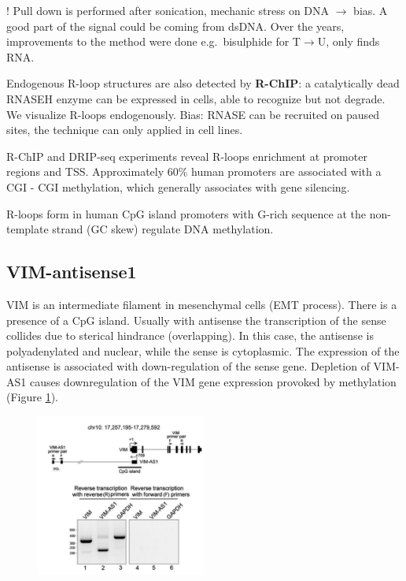 ! Pull down is performed after sonication, mechanic stress on DNA $\rightarrow$ bias. A good part of the signal could be coming from dsDNA. Over the years, improvements to the method were done e.g.~bisulphide for T$\rightarrow$U, only finds RNA.

Endogenous R-loop structures are also detected by \textbf{R-ChIP}: a catalytically dead RNASEH enzyme can be expressed in cells, able to recognize but not degrade. We visualize R-loops endogenously. Bias: RNASE can be recruited on paused sites, the technique can only applied in cell lines.

R-ChIP and DRIP-seq experiments reveal R-loops enrichment at promoter regions and TSS. Approximately 60\% human promoters are associated with a CGI - CGI methylation, which generally associates with gene silencing.

R-loops form in human CpG island promoters with G-rich sequence at the non-template strand (GC skew) regulate DNA methylation.

\hypertarget{vim-antisense1}{%
\subsection{VIM-antisense1}\label{vim-antisense1}}

VIM is an intermediate filament in mesenchymal cells (EMT process). There is a presence of a CpG island. Usually with antisense the transcription of the sense collides due to sterical hindrance (overlapping). In this case, the antisense is polyadenylated and nuclear, while the sense is cytoplasmic. The expression of the antisense is associated with down-regulation of the sense gene. Depletion of VIM-AS1 causes downregulation of the VIM gene expression provoked by methylation (Figure \ref{fig:vim}).

\begin{figure}
\centering
\includegraphics[width=0.5\textwidth]{../_resources/Screen_Shot_2022-11-23_at_10-18-00.png}
\caption{}
\label{fig:vim}
\end{figure}

